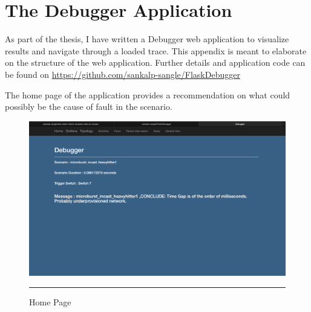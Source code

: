 
\chapter{The Debugger Application} %

\label{Appendix3} %


As part of the thesis, I have written a Debugger web application to visualize results
and navigate through a loaded trace. This appendix is meant to elaborate on the structure
of the web application. Further details and application code can be found on \url{https://github.com/sankalp-sangle/FlaskDebugger}

The home page of the application provides a recommendation on what could possibly be the cause of fault in the scenario.
\begin{figure}[htbp]
	\centering
		\includegraphics[width=1.0\columnwidth]{Figures/home.png}
		\rule{35em}{0.5pt}
	\caption[Home Page]{Home Page}
	\label{fig:home}
\end{figure}

